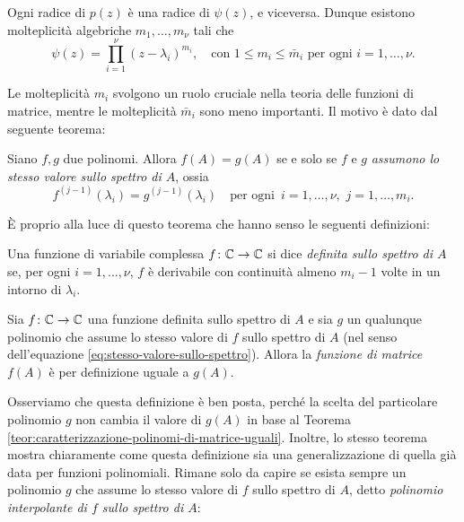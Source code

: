 \begin{teor}
Ogni radice di $p(z)$ è una radice di $\psi(z)$, e viceversa.
Dunque esistono molteplicità algebriche $m_1,\dots,m_\nu$ tali che
\[
\psi(z) = \prod_{i=1}^{\nu} (z-\lambda_i)^{m_i},
\quad \text{con } 1 \leq m_i \leq \bar{m}_i \text{ per ogni $i = 1,\dots,\nu$.}
\]
\end{teor}

\noindent Le molteplicità $m_i$ svolgono un ruolo cruciale nella teoria
delle funzioni di matrice, mentre le molteplicità $\bar{m}_i$
sono meno importanti. Il motivo è dato dal seguente teorema:

\begin{teor} \label{teor:caratterizzazione-polinomi-di-matrice-uguali}
Siano $f,g$ due polinomi. Allora $f(A) = g(A)$ se e solo se
$f$ e $g$ \emph{assumono lo stesso valore sullo spettro di $A$}, ossia
\begin{equation} \label{eq:stesso-valore-sullo-spettro}
f^{(j-1)}(\lambda_i) = g^{(j-1)}(\lambda_i)
\quad \text{per ogni $\,i = 1,\dots,\nu$, $\,j = 1,\dots,m_i$.}
\end{equation}
\end{teor}

\noindent È proprio alla luce di questo teorema che hanno senso
le seguenti definizioni:

\begin{defi}
Una funzione di variabile complessa $f \colon \mathbb{C} \to \mathbb{C}$
si dice \emph{definita sullo spettro di $A$} se,
per ogni $i = 1,\dots,\nu$, $f$ è derivabile con continuità
almeno $m_i-1$ volte in un intorno di $\lambda_i$.
\end{defi}

\begin{defi}
Sia $f \colon \mathbb{C} \to \mathbb{C}$ una funzione definita sullo spettro di $A$
e sia $g$ un qualunque polinomio che assume lo stesso valore di $f$
sullo spettro di $A$ (nel senso dell'equazione \eqref{eq:stesso-valore-sullo-spettro}).
Allora la \emph{funzione di matrice} $f(A)$ è per definizione uguale a $g(A)$.
\end{defi}

\noindent Osserviamo che questa definizione è ben posta, perché la scelta
del particolare polinomio $g$ non cambia il valore di $g(A)$ in base al
Teorema \ref{teor:caratterizzazione-polinomi-di-matrice-uguali}.
Inoltre, lo stesso teorema mostra chiaramente come questa definizione
sia una generalizzazione di quella già data per funzioni polinomiali.
Rimane solo da capire se esista sempre un polinomio $g$ che assume lo stesso
valore di $f$ sullo spettro di $A$, detto \emph{polinomio interpolante di $f$
sullo spettro di $A$}:

